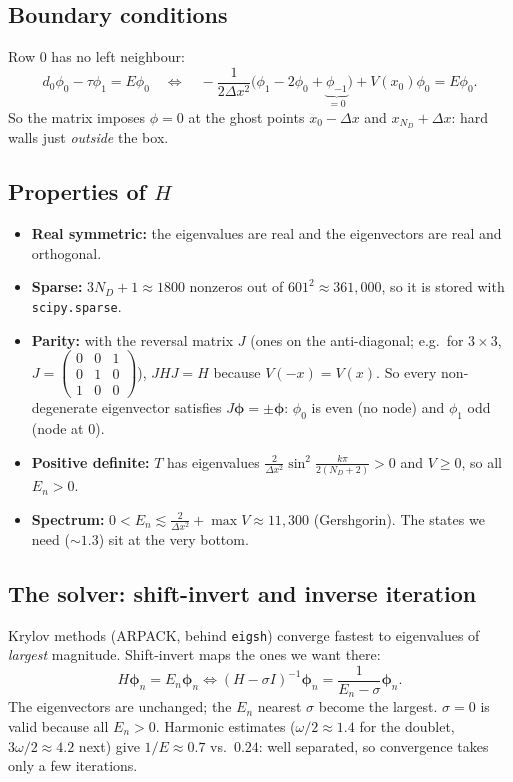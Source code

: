\documentclass[10pt]{article}
\newcommand{\code}[1]{\texttt{#1}}
\begin{document}
\subsection{Boundary conditions}
Row 0 has no left neighbour:
\[
d_0\phi_0-\tau\phi_1=E\phi_0\quad\Longleftrightarrow\quad-\frac1{2\Delta x^2}\big(\phi_1-2\phi_0+\underbrace{\phi_{-1}}_{=0}\big)+V(x_0)\phi_0=E\phi_0 .
\]
So the matrix imposes $\phi=0$ at the ghost points $x_0-\Delta x$ and $x_{N_D}+\Delta x$: hard walls just \emph{outside} the box.

\subsection{Properties of $H$}
\begin{itemize}
\item \textbf{Real symmetric:} the eigenvalues are real and the eigenvectors are real and orthogonal.
\item \textbf{Sparse:} $3N_D+1\approx1800$ nonzeros out of $601^2\approx361{,}000$, so it is stored with \code{scipy.sparse}.
\item \textbf{Parity:} with the reversal matrix $J$ (ones on the anti-diagonal; e.g.\ for $3\times3$, $J=\begin{pmatrix}0&0&1\\0&1&0\\1&0&0\end{pmatrix}$), $JHJ=H$ because $V(-x)=V(x)$. So every non-degenerate eigenvector satisfies $J\boldsymbol\phi=\pm\boldsymbol\phi$: $\phi_0$ is even (no node) and $\phi_1$ odd (node at $0$).
\item \textbf{Positive definite:} $T$ has eigenvalues $\frac{2}{\Delta x^2}\sin^2\!\frac{k\pi}{2(N_D+2)}>0$ and $V\ge0$, so all $E_n>0$.
\item \textbf{Spectrum:} $0<E_n\lesssim\frac{2}{\Delta x^2}+\max V\approx11{,}300$ (Gershgorin). The states we need ($\sim1.3$) sit at the very bottom.
\end{itemize}

\subsection{The solver: shift-invert and inverse iteration}
Krylov methods (ARPACK, behind \code{eigsh}) converge fastest to eigenvalues of \emph{largest} magnitude. Shift-invert maps the ones we want there:
\[
H\boldsymbol\phi_n=E_n\boldsymbol\phi_n\iff(H-\sigma I)^{-1}\boldsymbol\phi_n=\frac{1}{E_n-\sigma}\boldsymbol\phi_n .
\]
The eigenvectors are unchanged; the $E_n$ nearest $\sigma$ become the largest. $\sigma=0$ is valid because all $E_n>0$. Harmonic estimates ($\omega/2\approx1.4$ for the doublet, $3\omega/2\approx4.2$ next) give $1/E\approx0.7$ vs.\ $0.24$: well separated, so convergence takes only a few iterations.
\end{document}
